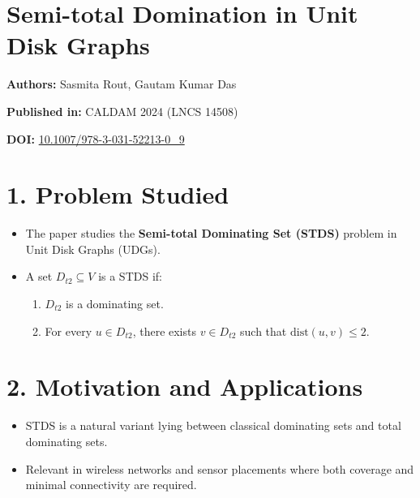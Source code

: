 \documentclass{article}
\title{}
\date{}
\begin{document}
\maketitle

\section*{Semi-total Domination in Unit Disk Graphs}


\textbf{Authors:} Sasmita Rout, Gautam Kumar Das

\textbf{Published in:} CALDAM 2024 (LNCS 14508)

\textbf{DOI:} \href{https://doi.org/10.1007/978-3-031-52213-0_9}{10.1007/978-3-031-52213-0\_9}

\vspace{1em}

\section*{1. Problem Studied}
\begin{itemize}[leftmargin=1.5em]
    \item The paper studies the \textbf{Semi-total Dominating Set (STDS)} problem in Unit Disk Graphs (UDGs).
    \item A set \( D_{t2} \subseteq V \) is a STDS if:
    \begin{enumerate}
        \item \( D_{t2} \) is a dominating set.
        \item For every \( u \in D_{t2} \), there exists \( v \in D_{t2} \) such that \( \text{dist}(u,v) \leq 2 \).
    \end{enumerate}
\end{itemize}

\section*{2. Motivation and Applications}
\begin{itemize}[leftmargin=1.5em]
    \item STDS is a natural variant lying between classical dominating sets and total dominating sets.
    \item Relevant in wireless networks and sensor placements where both coverage and minimal connectivity are required.
\end{itemize}
\end{document}
